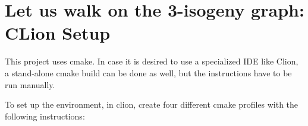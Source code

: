 \chapter{Let us walk on the 3-\/isogeny graph\+: CLion Setup }
\hypertarget{md__e_1_2pqc-engineering-ssec-23_2_r_e_a_d_m_e___clion___i_d_e}{}\label{md__e_1_2pqc-engineering-ssec-23_2_r_e_a_d_m_e___clion___i_d_e}
\label{md__e_1_2pqc-engineering-ssec-23_2_r_e_a_d_m_e___clion___i_d_e_autotoc_md35}%
%


This project uses {\ttfamily cmake}. In case it is desired to use a specialized IDE like Clion, a stand-\/alone {\ttfamily cmake} build can be done as well, but the instructions have to be run manually.

To set up the environment, in clion, create four different cmake profiles with the following instructions\+:


